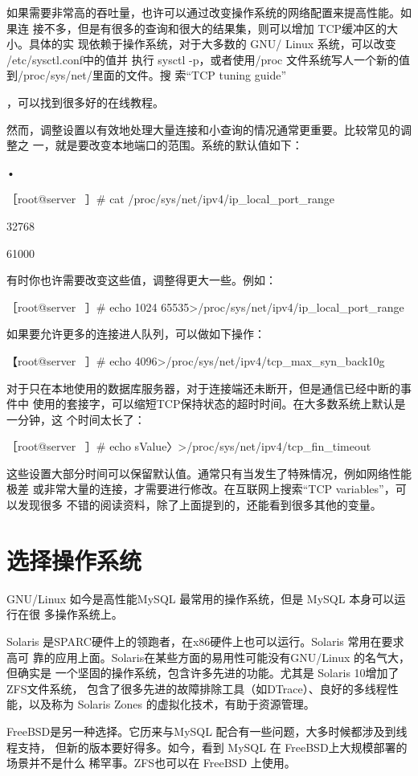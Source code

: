 如果需要非常高的吞吐量，也许可以通过改变操作系统的网络配置来提高性能。如果连
接不多，但是有很多的查询和很大的结果集，则可以增加 TCP缓冲区的大小。具体的实
现依赖于操作系统，对于大多数的 GNU/ Linux 系统，可以改变 /etc/sysctl.conf中的值并
执行 sysctl -p，或者使用/proc 文件系统写人一个新的值到/proc/sys/net/里面的文件。搜
索“TCP tuning guide”

，可以找到很多好的在线教程。

然而，调整设置以有效地处理大量连接和小查询的情况通常更重要。比较常见的调整之
一，就是要改变本地端口的范围。系统的默认值如下：

•

［root@server ~］# cat /proc/sys/net/ipv4/ip\_local\_port\_range

32768

61000

有时你也许需要改变这些值，调整得更大一些。例如：

［root@server ~］# echo 1024 65535>/proc/sys/net/ipv4/ip\_local\_port\_range

如果要允许更多的连接进人队列，可以做如下操作：

【root@server ~］# echo 4096>/proc/sys/net/ipv4/tcp\_max\_syn\_back10g

对于只在本地使用的数据库服务器，对于连接端还未断开，但是通信已经中断的事件中
使用的套接字，可以缩短TCP保持状态的超时时间。在大多数系统上默认是一分钟，这
个时间太长了：

［root@server ~］# echo sValue〉>/proc/sys/net/ipv4/tcp\_fin\_timeout

这些设置大部分时间可以保留默认值。通常只有当发生了特殊情况，例如网络性能极差
或非常大量的连接，才需要进行修改。在互联网上搜索“TCP variables”，可以发现很多
不错的阅读资料，除了上面提到的，还能看到很多其他的变量。

\section{选择操作系统}
GNU/Linux 如今是高性能MySQL 最常用的操作系统，但是 MySQL 本身可以运行在很
多操作系统上。

Solaris 是SPARC硬件上的领跑者，在x86硬件上也可以运行。Solaris 常用在要求高可
靠的应用上面。Solaris在某些方面的易用性可能没有GNU/Linux 的名气大，但确实是
一个坚固的操作系统，包含许多先进的功能。尤其是 Solaris 10增加了ZFS文件系统，
包含了很多先进的故障排除工具（如DTrace）、良好的多线程性能，以及称为 Solaris
Zones 的虚拟化技术，有助于资源管理。

FreeBSD是另一种选择。它历来与MySQL 配合有一些问题，大多时候都涉及到线程支持，
但新的版本要好得多。如今，看到 MySQL 在 FreeBSD上大规模部署的场景并不是什么
稀罕事。ZFS也可以在 FreeBSD 上使用。

